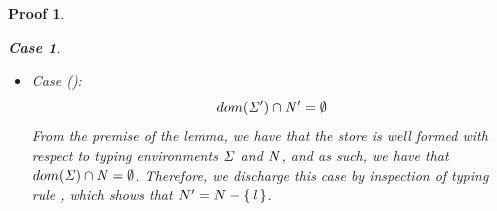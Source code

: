\documentclass[showabstract,showacknowledgments,showpreface,showdedication]{iuphd}
\newtheorem*{bcase}{Case}
\theoremstyle{nonumberplain}
\newtheorem{nproof}{Proof}
\begin{document}
\begin{nproof}
\begin{bcase}
\begin{itemize}
\begin{itemize}
\begin{itemize}
\begin{align*}
      \end{align*}
      The first two conjuncts follow from inversion on \tdatacon{}
      and \tconcreteloc{}, respectively, and the final one from Property~\ref{prf:dc-ew-f2}.
      Thus, we have that $\overharpoon{w_{n+1}} > \allocptr{\reg}{\STOR}$.
      It follows that $\overharpoon{w_{n+1}} > \allocptr{\reg}{\STOR'}$, because the
      newly written address in $\STOR'$, namely $i_1$, is such that $i_1 < \overharpoon{w_{n+1}}$.
      By defintion of the end witness, we discharge this case by establishing that
      $\overharpoon{w_{n+1}} = i_2 > \allocptr{\reg}{\STOR'}$.
      \end{itemize}
      The final obligation of this case concerns the requirement
      .
      Part of this obligation is given by the premise of this lemma, for the original
      store $\STOR$, and yields in particular that,
      for each $(\reg' \mapsto \emptyset) \in \AENV$, it
      is the case that $\reg' \not \in dom(\STOR)$.
      The remaining obligation is to show the property holds for the new store
      $\STOR'$, which discharges immediately because, although $\reg \in \STOR'$,
      by inversion on \tdatacon{}, it must be that
      $(\reg \mapsto \emptyset) \not \in \AENV$.
      \item
      Case ():
      \begin{displaymath}
      dom(\mathit{\Sigma}') \cap \mathit{N}' = \emptyset
      \end{displaymath}
      From the premise of the lemma, we have that the store is well formed with respect to typing
      environments $\mathit{\Sigma}$ and $\mathit{N}$, and as such, we have that
      $dom(\mathit{\Sigma}) \cap \mathit{N} = \emptyset$.
      Therefore, we discharge this case by inspection of typing rule \tdatacon{}, which
      shows that $N' = N - \{ \, \mathit{l} \,\}$.
    \end{itemize}
    \end{itemize}
  \end{bcase}


\end{nproof}
\end{document}
